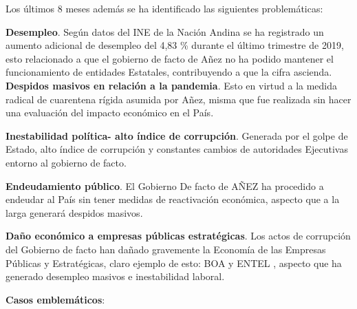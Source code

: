\documentclass[a4paper, nobind]{templates/ociamthesis}
\begin{document}
Los últimos 8 meses además se ha identificado las siguientes problemáticas:

\textbf{Desempleo}.
Según datos del INE de la Nación Andina se ha registrado un aumento adicional de desempleo del 4,83 \% durante el último trimestre de 2019, esto relacionado a que el gobierno de facto de Añez no ha podido mantener el funcionamiento de entidades Estatales, contribuyendo a que la cifra ascienda.
\textbf{Despidos masivos en relación a la pandemia}.
Esto en virtud a la medida radical de cuarentena rígida asumida por Añez, misma que fue realizada sin hacer una evaluación del impacto económico en el País.

\textbf{Inestabilidad política- alto índice de corrupción}.
Generada por el golpe de Estado, alto índice de corrupción y constantes cambios de autoridades Ejecutivas entorno al gobierno de facto.

\textbf{Endeudamiento público}.
El Gobierno De facto de AÑEZ ha procedido a endeudar al País sin tener medidas de reactivación económica, aspecto que a la larga generará despidos masivos.

\textbf{Daño económico a empresas públicas estratégicas}.
Los actos de corrupción del Gobierno de facto han dañado gravemente la Economía de las Empresas Públicas y Estratégicas, claro ejemplo de esto: BOA y ENTEL , aspecto que ha generado desempleo masivos e inestabilidad laboral.

\textbf{Casos emblemáticos}:
\end{document}
